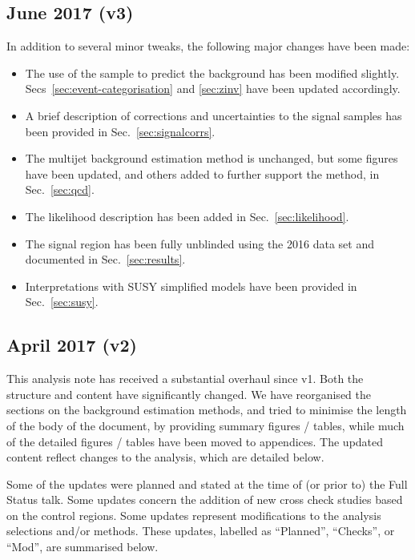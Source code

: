 \subsection{June  2017 (v3)}

In addition to several minor tweaks, the following major changes have
been made:
\begin{itemize}
\item The use of the \mmj sample to predict the \znunuj background has
  been modified slightly. Secs~\ref{sec:event-categorisation} and
  \ref{sec:zinv} have been updated accordingly.
\item A brief description of corrections and uncertainties to the
  signal samples has been provided in Sec.~\ref{sec:signalcorrs}.
\item The multijet background estimation method is unchanged, but some
  figures have been updated, and others added to further support the
  method, in Sec.~\ref{sec:qcd}. 
\item The likelihood description has been added in
  Sec.~\ref{sec:likelihood}. 
\item The signal region has been fully unblinded using the 2016 data
  set and documented in Sec.~\ref{sec:results}. 
\item Interpretations with SUSY simplified models have been provided
  in Sec.~\ref{sec:susy}. 
\end{itemize}

\subsection{April 2017 (v2)}

This analysis note has received a substantial overhaul since v1. Both
the structure and content have significantly changed.  We have
reorganised the sections on the background estimation methods, and
tried to minimise the length of the body of the document, by providing
summary figures / tables, while much of the detailed figures / tables
have been moved to appendices. The updated content reflect changes to
the analysis, which are detailed below.

Some of the updates were planned and stated at the time of (or prior
to) the Full Status talk. Some updates concern the addition of new
cross check studies based on the control regions. Some updates
represent modifications to the analysis selections and/or
methods. These updates, labelled as ``Planned'', ``Checks'', or
``Mod'', are summarised below.
  
